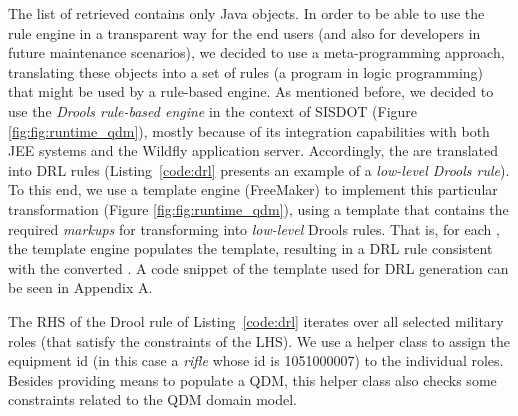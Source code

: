 


The list of retrieved \callers contains only Java objects. 
In order to be able to use the rule engine in a transparent way for the end users 
(and also for developers in future maintenance scenarios), we decided to use a 
meta-programming approach, translating these objects into a set of rules (a program in 
logic programming) that might be used by a rule-based engine. As mentioned before,  
we decided to use the \emph{Drools rule-based engine} in the context of 
SISDOT (Figure \ref{fig:fig:runtime_qdm}), mostly because of its integration capabilities 
with both JEE systems and the Wildfly application server. Accordingly,  
the \callers are translated into DRL rules (Listing~\ref{code:drl} presents an
example of a \emph{low-level Drools rule}). To this end, we use a template engine (FreeMaker) 
to implement this particular transformation (Figure \ref{fig:fig:runtime_qdm}), using a template 
that contains the required \emph{markups} for transforming \shc into \emph{low-level} Drools 
rules. That is, for each \shc, the template engine populates the template, 
resulting in a DRL rule consistent with the converted \shc.
A code snippet of the template used for DRL generation can be seen in Appendix A. 

The RHS of the Drool rule of Listing~\ref{code:drl}
iterates over all selected military roles (that satisfy
the constraints of the LHS). We use a helper class to
assign the equipment id (in this case a \emph{rifle} whose id is
1051000007) to the individual roles. Besides providing
means to populate a QDM, this helper class also checks
some constraints related to the QDM domain model. 



